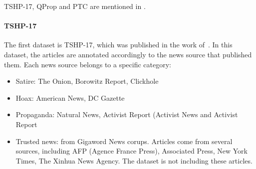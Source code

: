 TSHP-17, QProp and PTC are mentioned in \cite{da2020survey}.


\paragraph{TSHP-17}

The first dataset is TSHP-17, which was published in the work of~\citet{rashkin2017truth}. In this dataset, the articles are annotated accordingly to the news source that published them. Each news source belongs to a specific category:
\begin{itemize}
    \item Satire: The Onion, Borowitz Report, Clickhole
    \item Hoax: American News, DC Gazette
    \item Propaganda: Natural News, Activist Report (Activist News and Activist Report
    \item Trusted news: from Gigaword News corups. Articles come from several sources, including AFP (Agence France Press), Associated Press, New York Times, The Xinhua News Agency. The dataset is not including these articles.
\end{itemize}


